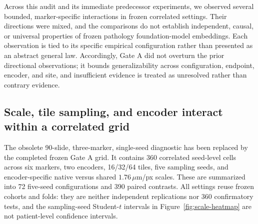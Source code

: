\label{sec:failure-modes}

Across this audit and its immediate predecessor experiments, we observed several bounded,
marker-specific interactions in frozen correlated settings. Their directions were mixed, and
the comparisons do not establish independent, causal, or universal properties of frozen
pathology foundation-model embeddings. Each observation is tied to its specific empirical
configuration rather than presented as an abstract general law.
Accordingly, Gate A did not overturn the prior directional observations; it bounds
generalizability across configuration, endpoint, encoder, and site, and insufficient evidence
is treated as unresolved rather than contrary evidence.

\subsection{Scale, tile sampling, and encoder interact within a correlated grid}

The obsolete 90-slide, three-marker, single-seed diagnostic has been replaced by the completed
frozen Gate A grid. It contains 360 correlated seed-level cells across six markers, two
encoders, 16/32/64 tiles, five sampling seeds, and encoder-specific native versus shared
$1.76\,\mu$m/px scales. These are summarized into 72 five-seed configurations and 390 paired
contrasts. All settings reuse frozen cohorts and folds: they are neither independent
replications nor 360 confirmatory tests, and the sampling-seed Student-$t$ intervals in
Figure~\ref{fig:scale-heatmap} are not patient-level confidence intervals.

